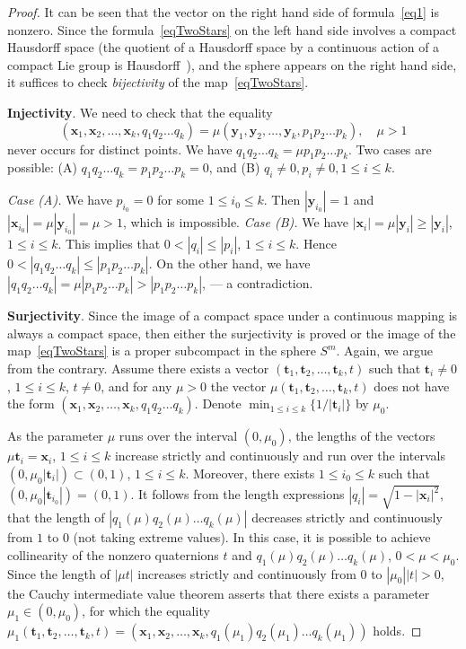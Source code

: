 \documentclass[english, 12pt]{amsproc}
\numberwithin{equation}{section}
\theoremstyle{plain}
\theoremstyle{definition}
\theoremstyle{remark}
\newcommand{\xb}{\mathbf{x}}
\newcommand{\tb}{\mathbf{t}}
\newcommand{\yb}{\mathbf{y}}
\begin{document}
\begin{proof}
It can be seen that the vector on the right hand side of formula~\eqref{eq1} is nonzero. Since the formula~\eqref{eqTwoStars} on the left hand side involves a compact Hausdorff space (the quotient of a Hausdorff space by a continuous action of a compact Lie group is Hausdorff~\cite{Bredon-ru}), and the sphere appears on the right hand side, it suffices to check {\it bijectivity} of the map~\eqref{eqTwoStars}.

\textbf{Injectivity}. We need to check that the equality
\begin{equation}\label{eq3}
(\xb_1, \xb_2, \ldots, \xb_k, q_1q_2\ldots q_k) = \mu (\yb_1, \yb_2, \ldots, \yb_k, p_1p_2\ldots p_k),\quad \mu>1
\end{equation}
never occurs for distinct points. We have $q_1q_2\ldots q_k = \mu p_1p_2\ldots p_k$. Two cases are possible: (A) $q_1q_2\ldots q_k = p_1p_2\ldots p_k = 0$, and (B) $q_i\neq 0, p_i\neq 0, 1\leqslant i \leqslant k$.

\textit{Case (A).} We have $p_{i_0} = 0$ for some $1\leqslant i_0\leqslant k$. Then $|\yb_{i_0}| = 1$ and $|\xb_{i_0}| = \mu |\yb_{i_0}| = \mu > 1$, which is impossible.
\textit{Case (B).} We have $|\xb_i| = \mu |\yb_i| \geqslant |\yb_i|$, $1\leqslant i\leqslant k$. This implies that $0 < |q_i|\leqslant |p_i|$, $1\leqslant i\leqslant k$. Hence $0 < |q_1q_2\ldots q_k| \leqslant |p_1p_2\ldots p_k|$. On the other hand, we have $|q_1q_2\ldots q_k| = \mu |p_1p_2\ldots p_k| > |p_1p_2\ldots p_k|$, --- a contradiction.

\textbf{Surjectivity}. Since the image of a compact space under a continuous mapping is always a compact space, then either the surjectivity is proved or the image of the map~\eqref{eqTwoStars} is a proper subcompact in the sphere $S^m$. Again, we argue from the contrary. Assume there exists a vector $(\tb_1, \tb_2, \ldots, \tb_k, t)$ such that $\tb_i \neq 0$, $1\leqslant i\leqslant k$, $t\neq 0$, and for any $\mu > 0$ the vector $\mu(\tb_1, \tb_2, \ldots, \tb_k, t)$ does not have the form $(\xb_1, \xb_2, \ldots, \xb_k, q_1q_2\ldots q_k)$. Denote $\min_{1\leqslant i\leqslant k}\{1 /|\tb_i|\}$ by $\mu_0$.

As the parameter $\mu$ runs over the interval $(0,\mu_0)$, the lengths of the vectors $\mu \tb_i = \xb_i$, $1\leqslant i\leqslant k$ increase strictly and continuously and run over the intervals $(0, \mu_0 |\tb_i|) \subset (0,1)$, $1\leqslant i\leqslant k$. Moreover, there exists $1\leqslant i_0\leqslant k$ such that $(0, \mu_0| \tb_{i_0} |) = (0,1)$. It follows from the length expressions $|q_i| = \sqrt{1- |\xb_i|^2}$, that the length of $|q_1(\mu)q_2(\mu)\ldots q_k(\mu)|$ decreases strictly and continuously from $1$ to $0$ (not taking extreme values). In this case, it is possible to achieve collinearity of the nonzero quaternions $t$ and $q_1(\mu)q_2(\mu)\ldots q_k(\mu)$, $0< \mu < \mu_0$. Since the length of $|\mu t|$ increases strictly and continuously from $0$ to $|\mu_0||t|>0$, the Cauchy intermediate value theorem asserts that there exists a parameter $\mu_1\in (0, \mu_0)$, for which the equality $\mu_1(\tb_1, \tb_2, \ldots, \tb_k, t) = (\xb_1, \xb_2, \ldots, \xb_k, q_1(\mu_1)q_2(\mu_1)\ldots q_k(\mu_1))$ holds.


\end{proof}
\end{document}
